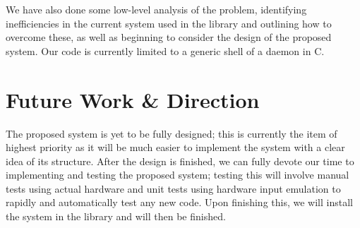 \documentclass{article}
\begin{document}
We have also done some low-level analysis of the problem, identifying inefficiencies in the current system used in the library and outlining how to overcome these, as well as beginning to consider the design of the proposed system. Our code is currently limited to a generic shell of a daemon in C.

\section{Future Work \& Direction}

The proposed system is yet to be fully designed; this is currently the item of highest priority as it will be much easier to implement the system with a clear idea of its structure. After the design is finished, we can fully devote our time to implementing and testing the proposed system; testing this will involve manual tests using actual hardware and unit tests using hardware input emulation to rapidly and automatically test any new code. Upon finishing this, we will install the system in the library and will then be finished.
\end{document}
